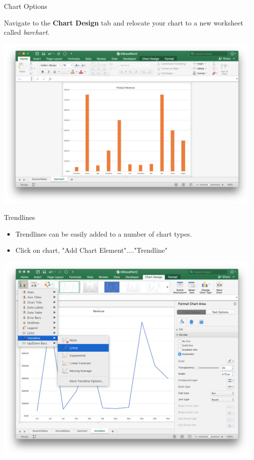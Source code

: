 \documentclass[xcolor=svgnames]{beamer}
\begin{document}
\begin{frame}{Chart Options}
\begin{example}
Navigate to the {\bf Chart Design} tab and relocate your chart to a new worksheet called \textit{barchart}. 
\end{example}
 \begin{center}
  \includegraphics[width=.8\textwidth]{barcharttab}
 \end{center}
\end{frame}


\begin{frame}{Trendlines}
\begin{itemize}
\item Trendlines can be easily added to a number of  chart types.  
\item  Click on chart, "Add Chart Element"...."Trendline"
\end{itemize}
 \begin{center}
  \includegraphics[width=.8\textwidth]{trendline}
 \end{center}
\end{frame}
\end{document}
